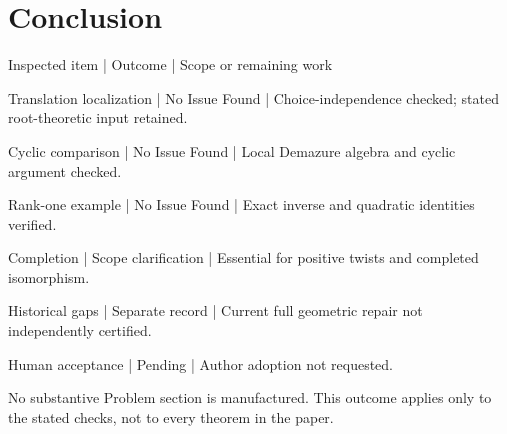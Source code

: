 \documentclass[10pt]{article}
\begin{document}
\section*{Conclusion}
Inspected item | Outcome | Scope or remaining work\par
Translation localization | No Issue Found | Choice-independence checked; stated root-theoretic input retained.\par
Cyclic comparison | No Issue Found | Local Demazure algebra and cyclic argument checked.\par
Rank-one example | No Issue Found | Exact inverse and quadratic identities verified.\par
Completion | Scope clarification | Essential for positive twists and completed isomorphism.\par
Historical gaps | Separate record | Current full geometric repair not independently certified.\par
Human acceptance | Pending | Author adoption not requested.\par
No substantive Problem section is manufactured. This outcome applies only to the stated checks, not to every theorem in the paper.\par
\end{document}
